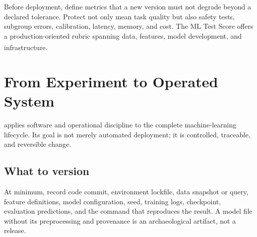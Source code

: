 Before deployment, define metrics that a new version must not degrade beyond a
declared tolerance.
Protect not only mean task quality but also safety tests, subgroup errors,
calibration, latency, memory, and cost.
The ML Test Score offers a production-oriented rubric spanning data,
features, model development, and
infrastructure.\textsuperscript{\cite{breckMLTestScore2017}}

\section{From Experiment to Operated System}

 applies software and operational discipline to the complete
machine-learning lifecycle.
Its goal is not merely automated deployment; it is controlled, traceable, and
reversible change.

\begin{center}
\label{fig:controlled-ml-lifecycle}
\end{center}

\subsection{What to version}

At minimum, record code commit, environment lockfile, data snapshot or query,
feature definitions, model configuration, seed, training logs, checkpoint,
evaluation predictions, and the command that reproduces the result.
A model file without its preprocessing and provenance is an archaeological
artifact, not a release.

